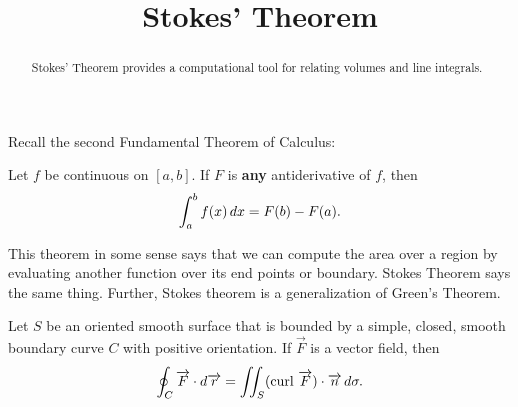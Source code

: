 \documentclass{ximera}
\title[Dig-In:]{Stokes' Theorem}
\begin{document}
\begin{abstract}
Stokes' Theorem provides a computational tool for relating volumes and line integrals.
\end{abstract}
\maketitle

Recall the second Fundamental Theorem of Calculus:

\begin{theorem}
  Let $f$ be continuous on $[a,b]$. If $F$ is \textbf{any}
  antiderivative of $f$, then
  \[
  \int_a^b f(x)\mathop{}\!d x = F(b)-F(a).
  \]
\end{theorem}

This theorem in some sense says that we can compute the area over a region by evaluating another function over its end points or boundary. Stokes Theorem says the same thing. Further, Stokes theorem is a generalization of Green's Theorem.



\begin{theorem}
  Let $S$ be an oriented smooth surface that is bounded by a simple, closed, smooth boundary curve $C$ with positive orientation. If $\overrightarrow{F}$ is a vector field, then
  \[
  \oint_C \overrightarrow{F} \cdot \mathop{}\!d \overrightarrow{r} = \iint_S (\text{curl }\overrightarrow{F}) \cdot \overrightarrow{n} \mathop{}\!d \sigma.
  \]
\end{theorem}
\end{document}
